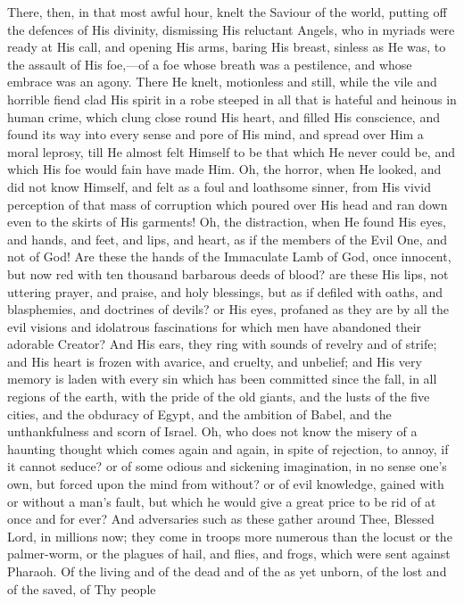 There, then, in that most awful hour, knelt the Saviour of the
world, putting off the defences of His divinity, dismissing His
reluctant Angels, who in myriads were ready at His call, and opening
His arms, baring His breast, sinless as He was, to the assault of His
foe,—of a foe whose breath was a pestilence, and whose embrace was
an agony. There He knelt, motionless and still, while the vile and
horrible fiend clad His spirit in a robe steeped in all that is
hateful and heinous in human crime, which clung close round His heart,
and filled His conscience, and found its way into every sense and pore
of His mind, and spread over Him a moral leprosy, till He almost felt
Himself to be that which He never could be, and which His foe would
fain have made Him. Oh, the horror, when He looked, and did not know
Himself, and felt as a foul and loathsome sinner, from His vivid
perception of that mass of corruption which poured over His head and
ran down even to the skirts of His garments! Oh, the distraction, when
He found His eyes, and hands, and feet, and lips, and heart, as if the
members of the Evil One, and not of God! Are these the hands of the
Immaculate Lamb of God, once innocent, but now red with ten thousand
barbarous deeds of blood? are these His lips, not uttering prayer, and
praise, and holy blessings, but as if defiled with oaths, and
blasphemies, and doctrines of devils? or His eyes, profaned as they
are by all the evil visions and idolatrous fascinations for which men
have abandoned their adorable Creator? And His ears, they ring with
sounds of revelry and of strife; and His heart is frozen with avarice,
and cruelty, and unbelief; and His very memory is laden with every sin
which has been committed since the fall, in all regions of the earth,
with the pride of the old giants, and the lusts of the five cities,
and the obduracy of Egypt, and the ambition of Babel, and the
unthankfulness and scorn of Israel. Oh, who does not know the misery
of a haunting thought which comes again and again, in spite of
rejection, to annoy, if it cannot seduce? or of some odious and
sickening imagination, in no sense one's own, but forced upon the mind
from without? or of evil knowledge, gained with or without a man's
fault, but which he would give a great price to be rid of at once and
for ever? And adversaries such as these gather around Thee, Blessed
Lord, in millions now; they come in troops more numerous than the
locust or the palmer-worm, or the plagues of hail, and flies, and
frogs, which were sent against Pharaoh. Of the living and of the dead
and of the as yet unborn, of the lost and of the saved, of Thy people

